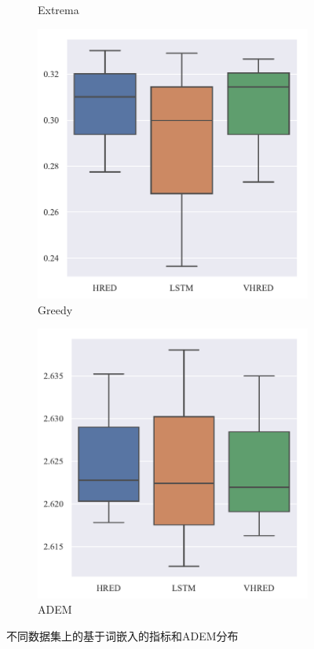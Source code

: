 \begin{figure}[H]
\begin{subfigure}{0.25\linewidth}
        \centering
        \caption{Extrema}
    \end{subfigure}%
    \begin{subfigure}{0.25\linewidth}
        \includegraphics[width=\linewidth]{figure/boxplot/model/embedding_based_greedy_matching/plot.pdf}
        \centering
        \caption{Greedy}
    \end{subfigure}%
    \begin{subfigure}{0.25\linewidth}
        \includegraphics[width=\linewidth]{figure/boxplot/model/adem/plot.pdf}
        \centering
        \caption{ADEM}
        \label{subfig:ADEM_model}
    \end{subfigure}
    \caption{不同数据集上的基于词嵌入的指标和ADEM分布}
    \label{fig:ADEM_EB_model}
\end{figure}

